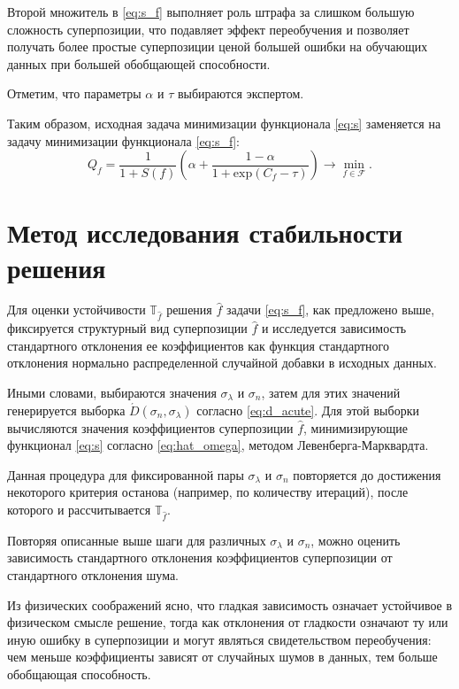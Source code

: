 \documentclass[11pt,a4paper]{article}
\theoremstyle{definition}
\begin{document}
Второй множитель в \eqref{eq:s_f} выполняет роль штрафа за слишком
большую сложность суперпозиции, что подавляет эффект переобучения и позволяет
получать более простые суперпозиции ценой большей ошибки на обучающих данных
при большей обобщающей способности.

Отметим, что параметры $\alpha$ и $\tau$ выбираются экспертом.

Таким образом, исходная задача минимизации функционала \eqref{eq:s} заменяется
на задачу минимизации функционала \eqref{eq:s_f}:
\begin{equation}
  Q_f = \frac{1}{1 + S(f)} \left(\alpha + \frac{1 - \alpha}{1 + \text{exp} (C_f - \tau)}\right) \rightarrow \min_{f \in \mathcal{F}}.
  \label{eq:s_f_min}
\end{equation}

\section{Метод исследования стабильности решения}

Для оценки устойчивости $\mathbb{T}_{\hat{f}}$ решения $\hat{f}$ задачи
\eqref{eq:s_f}, как предложено выше, фиксируется структурный вид суперпозиции
$\hat{f}$ и исследуется зависимость стандартного отклонения ее коэффициентов
как функция стандартного отклонения нормально распределенной случайной добавки
в исходных данных.

Иными словами, выбираются значения $\sigma_{\lambda}$ и $\sigma_n$, затем для этих
значений генерируется выборка $\acute{D}(\sigma_n, \sigma_{\lambda})$ согласно
\eqref{eq:d_acute}. Для этой выборки вычисляются значения коэффициентов суперпозиции
$\hat{f}$, минимизирующие функционал \eqref{eq:s} согласно \eqref{eq:hat_omega},
методом Левенберга-Марквардта.

Данная процедура для фиксированной пары $\sigma_{\lambda}$ и $\sigma_n$ повторяется
до достижения некоторого критерия останова (например, по количеству итераций),
после которого и рассчитывается $\mathbb{T}_{\hat{f}}$.

Повторяя описанные выше шаги для различных $\sigma_{\lambda}$ и $\sigma_n$, можно
оценить зависимость стандартного отклонения коэффициентов суперпозиции от
стандартного отклонения шума.

Из физических соображений ясно, что гладкая зависимость означает устойчивое в
физическом смысле решение, тогда как отклонения от гладкости означают
ту или иную ошибку в суперпозиции и могут являться свидетельством переобучения:
чем меньше коэффициенты зависят от случайных шумов в данных, тем больше обобщающая
способность.
\end{document}
